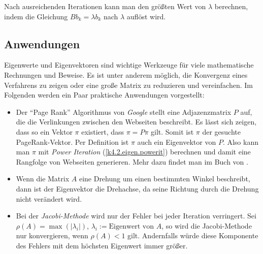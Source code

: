 \documentclass[]{dsadokumentation}
\begin{document}
Nach ausreichenden Iterationen kann man den größten Wert von $\lambda$ berechnen, indem die Gleichung $B b_{k} = \lambda b_{k}$ nach $\lambda$ auflöst wird. 


\subsection{Anwendungen}

Eigenwerte und Eigenvektoren sind wichtige Werkzeuge für viele mathematische Rechnungen und Beweise. Es ist unter anderem möglich, die Konvergenz eines Verfahrens zu zeigen oder eine große Matrix zu reduzieren und vereinfachen. Im Folgenden werden ein Paar praktische Anwendungen vorgestellt: 

\begin{itemize}
  \item Der \enquote{Page Rank} Algorithmus von \textit{Google} stellt eine Adjazenzmatrix $P$ auf, die die Verlinkungen zwischen den Webseiten beschreibt. Es lässt sich zeigen, dass so ein Vektor $\pi$ existiert, dass $\pi = P \pi$ gilt. Somit ist $\pi$ der gesuchte PageRank-Vektor. Per Definition ist $\pi$ auch ein Eigenvektor von $P$. Also kann man $\pi$ mit \textit{Power Iteration} (\cref{k4.2.eigen.powerit}) berechnen und damit eine Rangfolge von Webseiten generieren. Mehr dazu findet man im Buch von \textcite{k4.2.langville}. 
  \item Wenn die Matrix $A$ eine Drehung um einen bestimmten Winkel beschreibt, dann ist der Eigenvektor die Drehachse, da seine Richtung durch die Drehung nicht verändert wird. 
  \item Bei der \textit{Jacobi-Methode} wird nur der Fehler bei jeder Iteration verringert. Sei $\rho (A) = \max (|\lambda_{i}|)$, $\lambda_{i} := \text{Eigenwert von } A$, so wird die Jacobi-Methode nur konvergieren, wenn $\rho (A) < 1$ gilt. Andernfalls würde diese Komponente des Fehlers mit dem höchsten Eigenwert immer größer. 
\end{itemize}



\printbibliography{}
\end{document}
